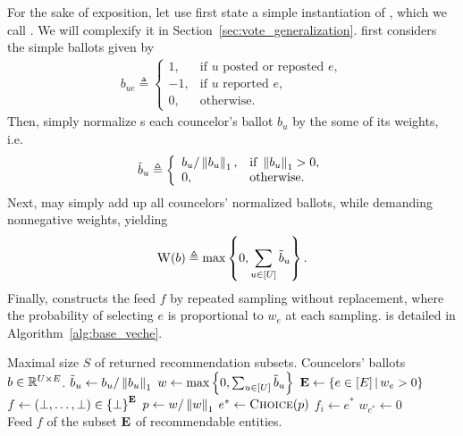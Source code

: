 For the sake of exposition,
let use first state a simple instantiation of \Veche{},
which we call \SimpleVeche{}.
We will complexify it in Section~\ref{sec:vote_generalization}.
\SimpleVeche{} first considers the simple ballots given by
\begin{align*}
    b_{ue} \triangleq \left\{
    \begin{array}{ll}
        1, & \text{if } u \text{ posted or reposted } e, \\
        -1, & \text{if } u \text{ reported } e, \\
        0, & \text{otherwise.}
    \end{array}
    \right.
\end{align*}
Then, \SimpleVeche{} simply normalize s
each councelor's ballot $b_u$ by the some of its weights, i.e.
\begin{align}
    \tilde b_u \triangleq \left\{
    \begin{array}{ll}
        b_u / \left\lVert{b_u}\right\rVert_{1}, & \text{if } \left\lVert{b_u}\right\rVert_{1} > 0, \\
        0, & \text{otherwise}.
    \end{array}
    \right.
\end{align}
Next, \SimpleVeche{} may simply add up all councelors' normalized ballots,
while demanding nonnegative weights, yielding
\begin{align}
    \textsc{W}(b) \triangleq \max \left\lbrace 0, \sum_{u \in [U]} \tilde{b}_u  \right\rbrace.
\end{align}
Finally, \SimpleVeche{} constructs the feed $f$
by repeated sampling without replacement,
where the probability of selecting $e$ is proportional to $w_e$ at each sampling.
\SimpleVeche{} is detailed in Algorithm~\ref{alg:base_veche}.

\begin{algorithm}
\caption{\SimpleVeche{}: A simple instantiation of \Veche{}}\label{alg:base_veche}
\begin{algorithmic}
\Require Maximal size $S$ of returned recommendation subsets. Councelors' ballots $b \in \mathbb R^{U \times E}$.
\State $\tilde b_{u} \gets b_u / \left\lVert{b_u}\right\rVert_{1}$
\State $w \gets \max \left\lbrace 0, \sum_{u \in [U]} \tilde b_{u}  \right\rbrace$
\State ${\bf E} \gets \left\lbrace e \in [E] \,\middle|\, w_e > 0 \right\rbrace$
\State $f \gets (\perp, \ldots, \perp) \in \left\lbrace \perp \right\rbrace^{\bf E}$
    \State $p \gets w / \left\lVert{w}\right\rVert_{1}$
    \State $e^* \gets \textsc{Choice}(p)$
    \State $f_i \gets e^*$
    \State $w_{e^*} \gets 0$
\EndFor \\
\Return Feed $f$ of the subset ${\bf E}$ of recommendable entities.
\end{algorithmic}
\end{algorithm}

